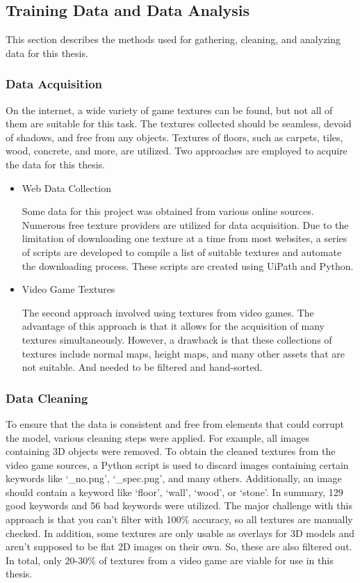 \newpage
\subsection{Training Data and Data Analysis}

This section describes the methods used for gathering, cleaning, and analyzing data for this thesis.

\subsubsection{Data Acquisition}

On the internet, a wide variety of game textures can be found, but not all of them are suitable for this task. The textures collected should be seamless, devoid of shadows, and free from any objects. Textures of floors, such as carpets, tiles, wood, concrete, and more, are utilized. Two approaches are employed to acquire the data for this thesis.

\begin{itemize}
    \item Web Data Collection

    Some data for this project was obtained from various online sources. Numerous free texture providers are utilized for data acquisition. Due to the limitation of downloading one texture at a time from most websites, a series of scripts are developed to compile a list of suitable textures and automate the downloading process. These scripts are created using UiPath and Python.
    
    \item Video Game Textures

    The second approach involved using textures from video games. The advantage of this approach is that it allows for the acquisition of many textures simultaneously. However, a drawback is that these collections of textures include normal maps, height maps, and many other assets that are not suitable. And needed to be filtered and hand-sorted.
\end{itemize}


\subsubsection{Data Cleaning}

    To ensure that the data is consistent and free from elements that could corrupt the model, various cleaning steps were applied. For example, all images containing 3D objects were removed. To obtain the cleaned textures from the video game sources, a Python script is used to discard images containing certain keywords like `\_no.png', `\_spec.png', and many others. Additionally, an image should contain a keyword like `floor', `wall', `wood', or `stone'. In summary, 129 good keywords and 56 bad keywords were utilized. The major challenge with this approach is that you can't filter with 100\% accuracy, so all textures are manually checked. In addition, some textures are only usable as overlays for 3D models and aren't supposed to be flat 2D images on their own. So, these are also filtered out. In total, only 20-30\% of textures from a video game are viable for use in this thesis.

